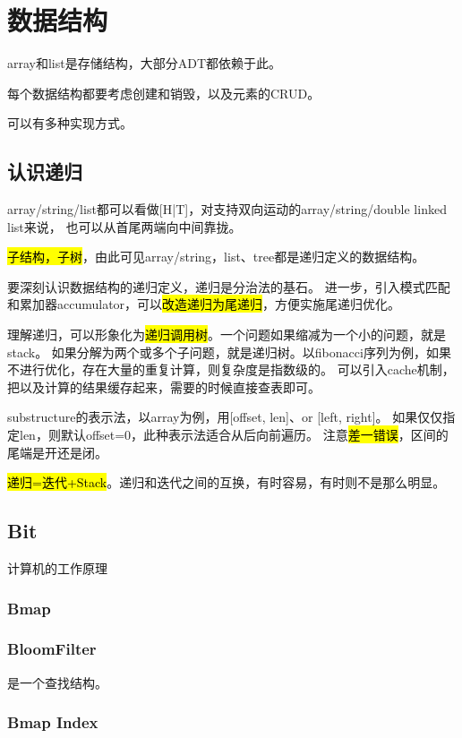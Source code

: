 \chapter{数据结构}

array和list是存储结构，大部分ADT都依赖于此。

每个数据结构都要考虑创建和销毁，以及元素的CRUD。

可以有多种实现方式。

\section{认识递归}

array/string/list都可以看做[H|T]，对支持双向运动的array/string/double linked list来说，
也可以从首尾两端向中间靠拢。

\hl{子结构，子树}，由此可见array/string，list、tree都是递归定义的数据结构。

要深刻认识数据结构的递归定义，递归是分治法的基石。
进一步，引入模式匹配和累加器accumulator，可以\hl{改造递归为尾递归}，方便实施尾递归优化。

理解递归，可以形象化为\hl{递归调用树}。一个问题如果缩减为一个小的问题，就是stack。
如果分解为两个或多个子问题，就是递归树。以fibonacci序列为例，如果不进行优化，存在大量的重复计算，则复杂度是指数级的。
可以引入cache机制，把以及计算的结果缓存起来，需要的时候直接查表即可。

substructure的表示法，以array为例，用[offset, len]、or [left, right]。
如果仅仅指定len，则默认offset=0，此种表示法适合从后向前遍历。
注意\hl{差一错误}，区间的尾端是开还是闭。

\hl{递归=迭代+Stack}。递归和迭代之间的互换，有时容易，有时则不是那么明显。

\section{Bit}

计算机的工作原理

\subsection{Bmap}

\subsection{BloomFilter}

是一个查找结构。

\subsection{Bmap Index}

